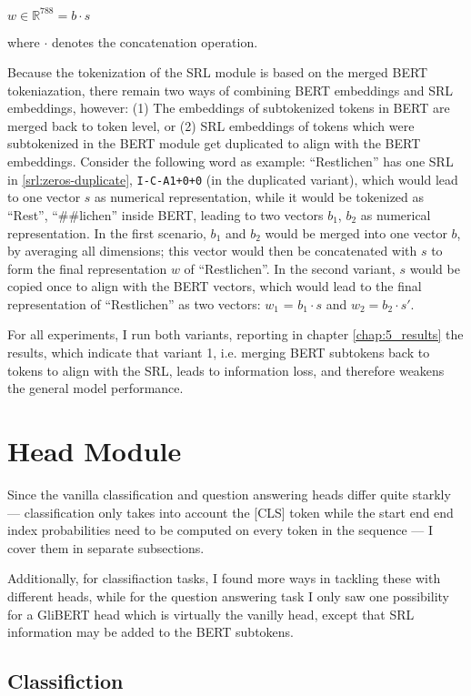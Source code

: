 $w \in \mathbb{R}^{788} = b \cdot  s$

where $\cdot$ denotes the concatenation operation.

Because the tokenization of the SRL module is based on the merged BERT tokeniazation,
there remain two ways of combining BERT embeddings and SRL embeddings, however: (1) The
embeddings of subtokenized tokens in BERT are merged back to token level, or (2) SRL
embeddings of tokens which were subtokenized in the BERT module get duplicated to align
with the BERT embeddings. Consider the following word as example: ``Restlichen'' has one
SRL in \ref{srl:zeros-duplicate}, \texttt{I-C-A1+0+0} (in the duplicated variant), which
would lead to one vector $s$ as numerical representation, while it would be tokenized as
``Rest'', ``\#\#lichen'' inside BERT, leading to two vectors $b_1$, $b_2$ as numerical
representation. In the first scenario, $b_1$ and $b_2$ would be merged into one vector
$b$, by averaging all dimensions; this vector would then be concatenated with $s$ to
form the final representation $w$ of ``Restlichen''. In the second variant, $s$ would be
copied once to align with the BERT vectors, which would lead to the final representation
of ``Restlichen'' as two vectors: $w_1$ = $b_1 \cdot s$ and $w_2 = b_2 \cdot s'$.

For all experiments, I run both variants, reporting in chapter \ref{chap:5_results} the results,
which indicate that variant 1, i.e. merging BERT subtokens back to tokens to align with the SRL,
leads to information loss, and therefore weakens the general model performance.


\section{Head Module}

Since the vanilla classification and question answering heads differ quite
starkly --- classification only takes into account the [CLS] token while
the start end end index probabilities need to be computed on every token
in the sequence --- I cover them in separate subsections.

Additionally, for classifiaction tasks, I found more ways in tackling these
with different heads, while for the question answering task I only saw one
possibility for a GliBERT head which is virtually the vanilly head, except
that SRL information may be added to the BERT subtokens.


\subsection{Classifiction}

